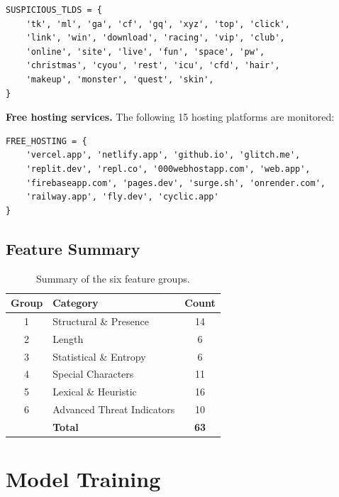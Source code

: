 \documentclass[a4paper,12pt]{article}
\begin{document}
\begin{lstlisting}[caption={Set of suspicious top-level domains}]
SUSPICIOUS_TLDS = {
    'tk', 'ml', 'ga', 'cf', 'gq', 'xyz', 'top', 'click',
    'link', 'win', 'download', 'racing', 'vip', 'club',
    'online', 'site', 'live', 'fun', 'space', 'pw',
    'christmas', 'cyou', 'rest', 'icu', 'cfd', 'hair',
    'makeup', 'monster', 'quest', 'skin',
}
\end{lstlisting}

\textbf{Free hosting services.} The following 15 hosting platforms are monitored:

\begin{lstlisting}[caption={Set of monitored free hosting domains}]
FREE_HOSTING = {
    'vercel.app', 'netlify.app', 'github.io', 'glitch.me',
    'replit.dev', 'repl.co', '000webhostapp.com', 'web.app',
    'firebaseapp.com', 'pages.dev', 'surge.sh', 'onrender.com',
    'railway.app', 'fly.dev', 'cyclic.app'
}
\end{lstlisting}

\subsection{Feature Summary}

\begin{table}[H]
\centering
\caption{Summary of the six feature groups.}
\label{tab:feat_summary}
\begin{tabular}{clc}
\toprule
\textbf{Group} & \textbf{Category} & \textbf{Count} \\
\midrule
1 & Structural \& Presence       & 14 \\
2 & Length                        & 6 \\
3 & Statistical \& Entropy       & 6 \\
4 & Special Characters            & 11 \\
5 & Lexical \& Heuristic          & 16 \\
6 & Advanced Threat Indicators    & 10 \\
\midrule
  & \textbf{Total}                & \textbf{63} \\
\bottomrule
\end{tabular}
\end{table}

\section{Model Training}
\label{sec:training}
\end{document}
